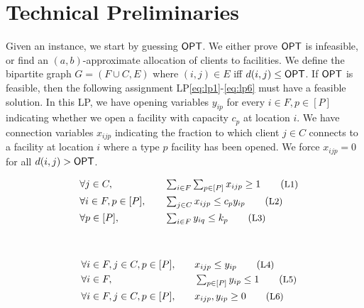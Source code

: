 \section{Technical Preliminaries}\label{sec:prelims}
Given an \mckc instance, we start by guessing $\mathsf{OPT}$. We either prove $\mathsf{OPT}$ is infeasible, or find an $(a,b)$-approximate allocation of clients to facilities.
	We define the bipartite graph $G = (F\cup C,E)$ where $(i,j)\in E$ iff $d(i,j) \leq \mathsf{OPT}$. If $\mathsf{OPT}$ is feasible, then the following assignment LP\eqref{eq:lp1}-\eqref{eq:lp6}
	must have a feasible solution.
In this LP, we  have opening  variables $y_{ip}$ for every $i\in F,p\in [P]$ indicating whether we open a facility with capacity $c_p$ at location $i$.
	We have connection variables $x_{ijp}$ indicating the fraction to which client $j\in C$ connects to a facility at location $i$ where a type $p$ facility has been opened. 
	We force $x_{ijp} = 0$ for all $d(i,j) > \mathsf{OPT}$. 
	
		
		\begin{minipage}{0.45\textwidth}
			\begin{alignat}{4}
				& \quad \forall j\in C,   &&\quad  \textstyle \sum_{i\in F} \sum_{p\in [P]}  x_{ijp} \geq 1 \label{eq:lp1} \tag{\small{L1}}  \\
				& \quad \forall i\in F,p\in [P] ,  &&\quad  \textstyle \sum_{j\in C}  x_{ijp} \leq c_py_{ip} \label{eq:lp2} \tag{\small{L2}} \\
				& \quad \forall p\in [P], && \quad \textstyle \sum_{i\in F} y_{iq}   \leq k_p \label{eq:lp3}  \tag{\small{L3}} 
			\end{alignat}
		\end{minipage}
		~\vline~
		\begin{minipage}{0.45\textwidth}
			\begin{alignat}{4}
				& \quad \forall i\in F, j\in C,p\in [P],  && \quad x_{ijp} \leq y_{ip}\label{eq:lp4}   \tag{\small{L4}} \\
				& \quad \forall i\in F, && \quad \textstyle\sum_{p\in [P]} y_{ip} \leq 1 \label{eq:lp5}  \tag{\small{L5}} \\
				& \quad \forall i\in F,j\in C,p\in [P], && \quad x_{ijp},y_{ip} \geq 0\label{eq:lp6}\tag{\small{L6}} 
			\end{alignat}
		\end{minipage}
\smallskip

